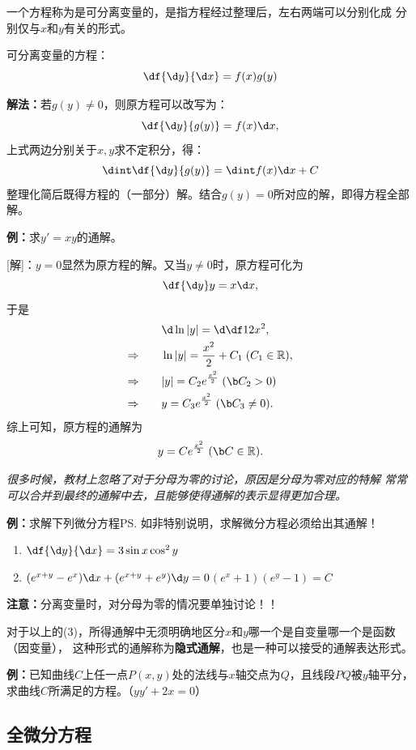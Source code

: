 一个方程称为是可分离变量的，是指方程经过整理后，左右两端可以分别化成
分别仅与$x$和$y$有关的形式。

\begin{thx}
	{可分离变量的方程：}
	$$\df{\d y}{\d x}=f(x)g(y)$$ 

	{\bf 解法：}若$g(y)\ne 0$，则原方程可以改写为：
	$$\df{\d y}{g(y)}=f(x)\d x,$$ 
	上式两边分别关于$x,y$求不定积分，得：
	$$\dint\df{\d y}{g(y)}=\dint f(x)\d x+C$$ 
	整理化简后既得方程的（一部分）解。结合$g(y)=0$所对应的解，即得方程全部解。
\end{thx}

{\bf 例：}求$y'=xy$的通解。
	
[解]：$y=0$显然为原方程的解。又当$y\ne0$时，原方程可化为
$$\df{\d y}y=x\d x,$$
于是
\begin{align*}
	&  \quad\d\ln|y|=\d\df12x^2,\\
	\Rightarrow\quad & \quad\ln|y|={\frac{x^2}2}+C_1\;(C_1\in\mathbb{R}),\\
	\Rightarrow\quad & \quad|y|=C_2e^{\frac{x^2}2}\;({\b C_2>0})\\
	\Rightarrow\quad & \quad y=C_3e^{\frac{x^2}2}\;({\b C_3\ne0}).
\end{align*}
综上可知，原方程的通解为
$$y=Ce^{\frac{x^2}2}\;({\b C\in\mathbb{R}}).$$\fin

{\b\it 很多时候，教材上忽略了对于分母为零的讨论，原因是分母为零对应的特解
常常可以合并到最终的通解中去，且能够使得通解的表示显得更加合理。}

{\bf 例：}求解下列微分方程\ps{如非特别说明，求解微分方程必须给出其通解！}
\begin{enumerate}[(1)]
  \setlength{\itemindent}{1cm}
  \item $\df{\d y}{\d x}=3\sin x\cos^2 y$
  \item $(e^{x+y}-e^x)\d x+(e^{x+y}+e^y)\d y=0$\hfill $(e^x+1)(e^y-1)=C$
\end{enumerate}

{\bf 注意：}分离变量时，对分母为零的情况要单独讨论！！

对于以上的(3)，所得通解中无须明确地区分$x$和$y$哪一个是自变量哪一个是函数（因变量），
这种形式的通解称为{\bf 隐式通解}，也是一种可以接受的通解表达形式。

{\bf 例：}已知曲线$C$上任一点$P(x,y)$处的法线与$x$轴交点为$Q$，且线段$PQ$被$y$轴平分，
求曲线$C$所满足的方程。\hfill（$yy'+2x=0$）

\subsection{全微分方程}

